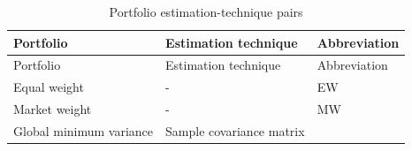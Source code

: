 \documentclass[
]{article}
\begin{document}
\begin{longtable}[]{@{}lll@{}}
\caption{\label{tab:portestpairs} Portfolio estimation-technique pairs}\tabularnewline
\toprule
\begin{minipage}[b]{0.26\columnwidth}\raggedright
Portfolio\strut
\end{minipage} & \begin{minipage}[b]{0.51\columnwidth}\raggedright
Estimation technique\strut
\end{minipage} & \begin{minipage}[b]{0.15\columnwidth}\raggedright
Abbreviation\strut
\end{minipage}\tabularnewline
\midrule
\endfirsthead
\toprule
\begin{minipage}[b]{0.26\columnwidth}\raggedright
Portfolio\strut
\end{minipage} & \begin{minipage}[b]{0.51\columnwidth}\raggedright
Estimation technique\strut
\end{minipage} & \begin{minipage}[b]{0.15\columnwidth}\raggedright
Abbreviation\strut
\end{minipage}\tabularnewline
\midrule
\endhead
\begin{minipage}[t]{0.26\columnwidth}\raggedright
Equal weight\strut
\end{minipage} & \begin{minipage}[t]{0.51\columnwidth}\raggedright
-\strut
\end{minipage} & \begin{minipage}[t]{0.15\columnwidth}\raggedright
EW\strut
\end{minipage}\tabularnewline
\begin{minipage}[t]{0.26\columnwidth}\raggedright
Market weight\strut
\end{minipage} & \begin{minipage}[t]{0.51\columnwidth}\raggedright
-\strut
\end{minipage} & \begin{minipage}[t]{0.15\columnwidth}\raggedright
MW\strut
\end{minipage}\tabularnewline
\begin{minipage}[t]{0.26\columnwidth}\raggedright
Global minimum variance\strut
\end{minipage} & \begin{minipage}[t]{0.51\columnwidth}\raggedright
Sample covariance matrix\strut
\end{minipage} & \begin{minipage}[t]{0.15\columnwidth}\raggedright

\end{minipage}
\end{longtable}
\end{document}
